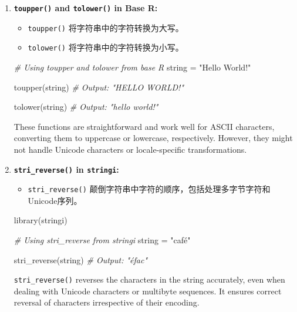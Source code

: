 \documentclass[
]{article}
\newenvironment{Shaded}{}{}
\newcommand{\CommentTok}[1]{\textcolor[rgb]{0.38,0.63,0.69}{\textit{#1}}}
\newcommand{\FunctionTok}[1]{\textcolor[rgb]{0.02,0.16,0.49}{#1}}
\newcommand{\NormalTok}[1]{#1}
\newcommand{\OtherTok}[1]{\textcolor[rgb]{0.00,0.44,0.13}{#1}}
\newcommand{\StringTok}[1]{\textcolor[rgb]{0.25,0.44,0.63}{#1}}
\begin{document}
\begin{enumerate}
\def\labelenumi{\arabic{enumi}.}
\item
  \textbf{\texttt{toupper()} and \texttt{tolower()} in Base R:}

  \begin{itemize}
  \item
    \texttt{toupper()} 将字符串中的字符转换为大写。
  \item
    \texttt{tolower()} 将字符串中的字符转换为小写。
  \end{itemize}

\begin{Shaded}
\begin{Highlighting}[]
\CommentTok{\# Using toupper and tolower from base R}
\NormalTok{string }\OtherTok{=} \StringTok{"Hello World!"}

\FunctionTok{toupper}\NormalTok{(string)}
\CommentTok{\# Output: "HELLO WORLD!"}

\FunctionTok{tolower}\NormalTok{(string)}
\CommentTok{\# Output: "hello world!"}
\end{Highlighting}
\end{Shaded}

  These functions are straightforward and work well for ASCII
  characters, converting them to uppercase or lowercase, respectively.
  However, they might not handle Unicode characters or locale-specific
  transformations.
\item
  \textbf{\texttt{stri\_reverse()} in \texttt{stringi}:}

  \begin{itemize}
  \item
    \texttt{stri\_reverse()}
    颠倒字符串中字符的顺序，包括处理多字节字符和Unicode序列。
  \end{itemize}

\begin{Shaded}
\begin{Highlighting}[]
\FunctionTok{library}\NormalTok{(stringi)}

\CommentTok{\# Using stri\_reverse from stringi}
\NormalTok{string }\OtherTok{=} \StringTok{"café"}

\FunctionTok{stri\_reverse}\NormalTok{(string)}
\CommentTok{\# Output: "éfac"}
\end{Highlighting}
\end{Shaded}

  \texttt{stri\_reverse()} reverses the characters in the string
  accurately, even when dealing with Unicode characters or multibyte
  sequences. It ensures correct reversal of characters irrespective of
  their encoding.
\end{enumerate}
\end{document}
